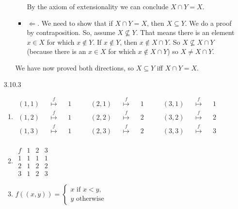 \begin{itemize}
\begin{enumerate}[(a)]
\begin{itemize}
                By the axiom of extensionality we can conclude $X \cap Y = X$.

              \item $\Leftarrow$. We need to show that if $X \cap Y = X$, then $X \subseteq Y$.
                We do a proof by contraposition.
                So, assume $X \not \subseteq Y$.
                That means there is an element $x \in X$ for which $x \not \in Y$.
                If $x \not \in Y$, then $x \not \in X \cap Y$.
                So $X \not \subseteq X \cap Y$ (because there is an $x \in X$ for which $x \not \in X \cap Y$) so $X \not = X \cap Y$.

            \end{itemize}

We have now proved both directions, so $X \subseteq Y$ iff $X \cap Y = X$.

\end{enumerate}
\item[3.10.3] \
\begin{enumerate}
    \item $	\begin{matrix}
		(1,1) && \overset{f}{\mapsto} && 1 \\ 
		(1,2) && \overset{f}{\mapsto} && 1 \\ 
		(1,3) && \overset{f}{\mapsto} && 1 \\
	\end{matrix} 
	\qquad	
	\begin{matrix}
		(2,1) && \overset{f}{\mapsto} && 1 \\
		(2,2) && \overset{f}{\mapsto} && 2\\
		(2,3) && \overset{f}{\mapsto} && 2\\
	\end{matrix}
	\qquad
		\begin{matrix}
 		(3,1)&& \overset{f}{\mapsto} && 1\\
		(3,2)&& \overset{f}{\mapsto} && 2\\
		(3,3) && \overset{f}{\mapsto} && 3\\
	\end{matrix}$
	\item $\begin{array}{c|ccc}
		f & 1 & 2 & 3 \\ \hline
		1 & 1& 1& 1 \\
		2 & 1 & 2 &2 \\
		3 & 1 & 2 & 3 
	\end{array}$
	\item 	$
	f((x, y)) = 
	\begin{cases}
	x \text{ if } x < y,\\
	y \text{ otherwise}
	\end{cases}
	$
\end{enumerate}{}


\end{itemize}
